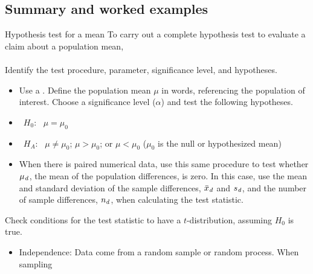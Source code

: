 \subsection[Summary and worked examples]{Summary and worked examples}
\begin{onebox}{Hypothesis test for a mean}
To carry out a complete hypothesis test to evaluate a claim about a population mean,
\\
\\
 Identify the test procedure, parameter, significance level, and hypotheses.\vspace{-1mm}
\begin{itemize}
\item[] Use a . Define the population mean $\mu$ in words, referencing the population of interest.  Choose a significance level ($\alpha$) and test the following hypotheses.
\end{itemize}
\vspace{-3mm}
\begin{itemize}
\setlength{\itemsep}{0mm} 
\item[] \quad \ $H_0$: \, $\mu = \mu_0$ 
\item[] \quad \ $H_A$: \ $\mu \ne \mu_0$;  \; $\mu > \mu_0$; \; or \; $\mu < \mu_0$ \qquad ($\mu_0$ is the null or hypothesized mean)\vspace{1mm}
\item[] When there is paired numerical data, use this same procedure to test whether $\mu_{\text{\emph{d}}}$, the mean of the population differences, is zero.  In this case, use the mean and standard deviation of the sample differences,  $\bar{x}_{\text{\emph{d}}}$ and  $s_{\text{\emph{d}}}$, and the number of sample differences, $n_{\text{\emph{d}}}$, when calculating the test statistic.
\end{itemize} 
 Check conditions for the test statistic to have a $t$-distribution, assuming $H_0$ is true.  \vspace{-1mm}
{\setlength{\leftmargini}{13mm}
\begin{itemize}
\setlength{\itemsep}{0mm}
\item[1.] Independence:  Data come from a random sample or random process.  When sampling 

\end{itemize}}
\end{onebox}
